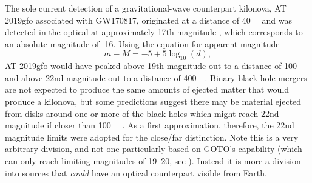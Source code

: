 \begin{colsection}
\begin{colsection}
The sole current detection of a gravitational-wave counterpart kilonova, AT 2019gfo associated with GW170817, originated at a distance of \SI{40}{\mega\parsec} and was detected in the optical at approximately 17th magnitude \citep[Swope first observed the kilonova 10.9 hours after the event with \textit{i}$=17.057\pm0.018$ mag,][]{GW170817_Swope}, which corresponds to an absolute magnitude of -16. Using the equation for apparent magnitude
%
\begin{equation}
    m-M = -5 +5\log_{10}(d),
    \label{eq:absolute_magnitude}
\end{equation}
%
AT 2019gfo would have peaked above 19th magnitude out to a distance of \SI{100}{\mega\parsec} and above 22nd magnitude out to a distance of \SI{400}{\mega\parsec}. Binary-black hole mergers are not expected to produce the same amounts of ejected matter that would produce a kilonova, but some predictions suggest there may be material ejected from disks around one or more of the black holes which might reach 22nd magnitude if closer than \SI{100}{\mega\parsec} \citep{BBH_EM, BBH_Gompertz}. As a first approximation, therefore, the 22nd magnitude limits were adopted for the close/far distinction. Note this is a very arbitrary division, and not one particularly based on GOTO's capability (which can only reach limiting magnitudes of 19--20, see ). Instead it is more a division into sources that \emph{could} have an optical counterpart visible from Earth.


\end{colsection}
\end{colsection}
